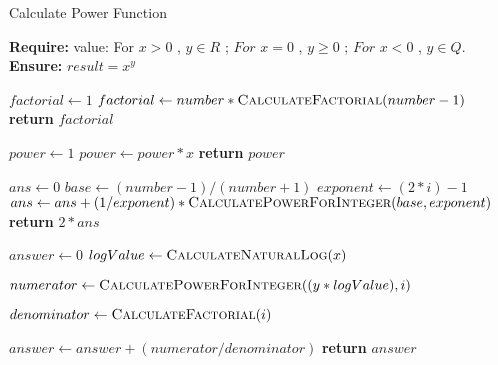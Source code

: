 \documentclass{article}
\begin{document}
\begin{algorithm}

\caption{Calculate Power Function}

\textbf{Require:}  value: For  $ x > 0$ ,  $y \in R$ ;	
   $For$ $ x = 0$ , $ y \ge 0$ ;
   $For$ $ x < 0$ , $ y \in Q $.
\textbf{Ensure:} $result =  x^y$

\begin{algorithmic}[1]


   \State $factorial \leftarrow 1$
   \State  $factorial \leftarrow number * \Call{CalculateFactorial}{number-1} $
   \State \textbf{return} $factorial$
    \EndProcedure 
\Statex


     \State $power \leftarrow 1$
    \State $power \leftarrow power * x$
    \EndFor
    \State \textbf{return} $power$
    \EndProcedure
\Statex

    \State $ans \leftarrow 0$
    \State $base \leftarrow (number-1) / (number+1)$
    \State $exponent \leftarrow (2 * i) -1$
    \State $ans \leftarrow ans + (1/exponent) * \Call{CalculatePowerForInteger}{base,exponent} $
    \EndFor
    \State \textbf{return} $2*ans$
    \EndProcedure
\Statex

    \State $answer \leftarrow 0$
     \State $logValue \leftarrow \Call{CalculateNaturalLog}{x} $
       
    \State $numerator \leftarrow \Call{CalculatePowerForInteger}{(y*logValue),i} $
    
    \State $denominator \leftarrow \Call{CalculateFactorial}{i} $
    
    \State $answer \leftarrow answer + (numerator/denominator)$
    \EndFor
    \State \textbf{return} $answer$
    \EndProcedure
\Statex

\end{algorithmic}
\end{algorithm}
\end{document}
